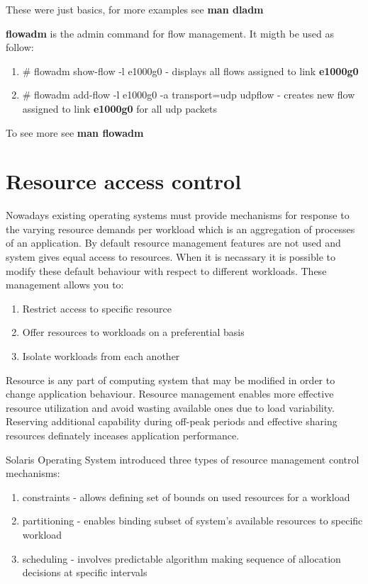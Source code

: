 \documentclass[11pt]{book}
\begin{document}
                        These were just basics, for more examples see \textbf{man dladm}

                        \medskip
        
                        \textbf{flowadm} is the admin command for flow management. It migth be used as follow:     

                        \begin{enumerate}
                                \item{\# flowadm show-flow -l e1000g0 - displays all flows assigned to link \textbf{e1000g0}}
                                \item{\# flowadm add-flow -l e1000g0 -a transport=udp udpflow - creates new flow assigned to link \textbf{e1000g0} for all udp packets}
                        \end{enumerate}

                        To see more see \textbf{man flowadm}
        

    \section{Resource access control}

                Nowadays existing operating systems must provide mechanisms for response to the varying resource 
		demands per workload which is an aggregation of processes of an application. By default resource management
		features are not used and system gives equal access to resources. When it is necassary it is possible 
		to modify these default behaviour with respect to different workloads. These management allows you to:
		\begin{enumerate}
        	\item{Restrict access to specific resource}
			\item{Offer resources to workloads on a preferential basis}
			\item{Isolate workloads from each another}
		\end{enumerate}
	
		Resource is any part of computing system that may be modified in order to change application behaviour. Resource management enables more 
		effective resource utilization and avoid wasting available ones due to load variability. Reserving additional capability
		during off-peak periods and effective sharing resources definately inceases application performance.
		
		Solaris Operating System introduced three types of resource management control mechanisms:
		\begin{enumerate}
        	\item{constraints - allows defining set of bounds on used resources for a workload}
			\item{partitioning - enables binding subset of system's available resources to specific workload}
			\item{scheduling - involves predictable algorithm making sequence of allocation decisions at specific intervals}
		 \end{enumerate}
                
\end{document}
